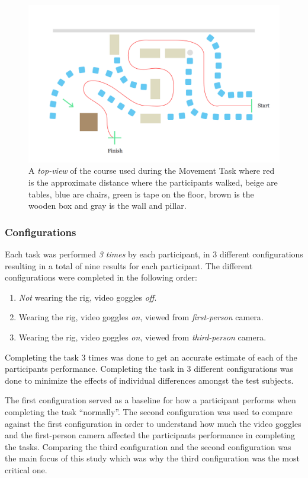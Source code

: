\documentclass[runningheads,a4paper,oribibl]{llncs}
\begin{document}
\begin{figure}
   \centering
   \includegraphics[width=\textwidth]{ExternalMaterial/Course-top}
   \caption{A \emph{top-view} of the course used during the Movement Task where red is the approximate distance where the participants walked, beige are tables, blue are chairs, green is tape on the floor, brown is the wooden box and gray is the wall and pillar.} \label{fig:CourseTop}
\end{figure}


\subsubsection{Configurations} \label{subsubsec:Configurations}
Each task was performed \emph{3 times} by each participant, in 3 different configurations resulting in a total of nine results for each participant. The different configurations were completed in the following order:
\begin{enumerate}
	\item \emph{Not} wearing the rig, video goggles \emph{off}.
	\item Wearing the rig, video goggles \emph{on}, viewed from \emph{first-person} camera.
	\item Wearing the rig, video goggles \emph{on}, viewed from \emph{third-person} camera.
\end{enumerate} 

Completing the task 3 times was done to get an accurate estimate of each of the participants performance. Completing the task in 3 different configurations was done to minimize the effects of individual differences amongst the test subjects. 

The first configuration served as a baseline for how a participant performs when completing the task ``normally''. The second configuration was used to compare against the first configuration in order to understand how much the video goggles and the first-person camera affected the participants performance in completing the tasks. Comparing the third configuration and the second configuration was the main focus of this study which was why the third configuration was the most critical one.
\end{document}

